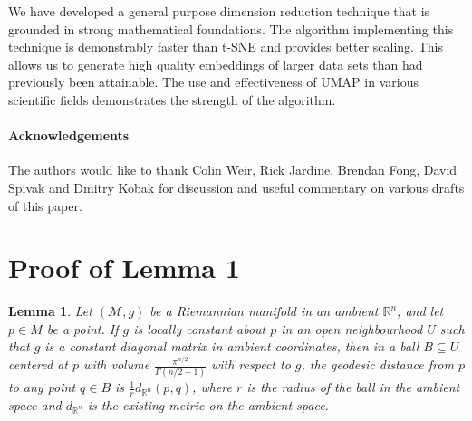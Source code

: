 \documentclass[12pt]{article}
\newtheorem{lem}{Lemma}
\begin{document}
We have developed a general purpose dimension reduction technique that is grounded in strong mathematical foundations.  The algorithm implementing this technique is demonstrably faster than t-SNE and provides better scaling.  This allows us to generate high quality embeddings of larger data sets than had previously been attainable. The use and effectiveness of UMAP in various scientific fields demonstrates the strength of the algorithm.


\paragraph{Acknowledgements}
The authors would like to thank Colin Weir, Rick Jardine, Brendan Fong, David Spivak and Dmitry Kobak for discussion and useful commentary on various drafts of this paper.
\appendix

\renewcommand\thesection{\Alph{section}}
\setcounter{section}{0}

\section{Proof of Lemma 1}

\setcounter{lem}{0}
\begin{lem}\label{lem:geo-dist}
Let $(\mathcal{M}, g)$ be a Riemannian manifold in an ambient $\mathbb{R}^n$, and let $p \in M$ be a point. If $g$ is locally constant about $p$ in an open neighbourhood $U$ such that $g$ is a constant diagonal matrix in ambient coordinates, then in a ball $B\subseteq U$ centered at $p$ with volume $\frac{\pi^{n/2}}{\Gamma(n/2 + 1)}$ with respect to $g$, the geodesic distance from $p$ to any point $q\in B$ is $\frac{1}{r} d_{\mathbb{R}^n}(p, q)$, where $r$ is the radius of the ball in the ambient space and $d_{\mathbb{R}^n}$ is the existing metric on the ambient space.
\end{lem}
\end{document}
